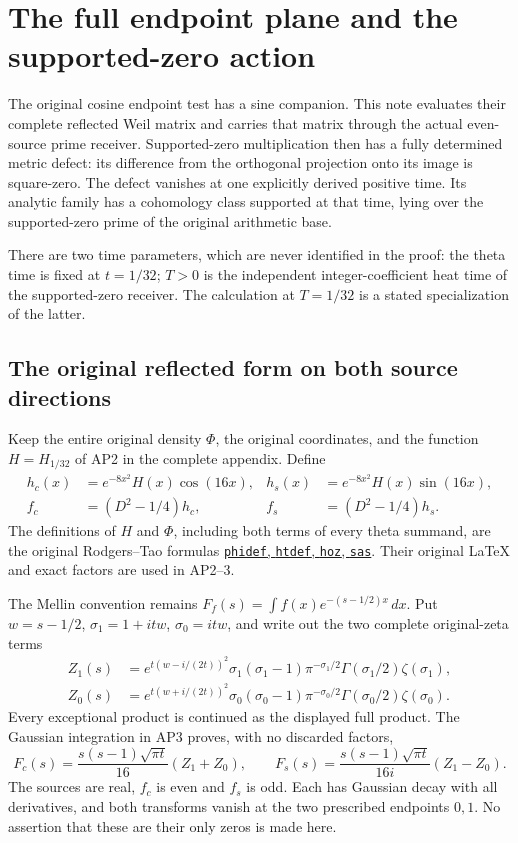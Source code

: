 \section{The full endpoint plane and the supported-zero action}

The original cosine endpoint test has a sine companion. This note
evaluates their complete reflected Weil matrix and carries that matrix
through the actual even-source prime receiver. Supported-zero
multiplication then has a fully determined metric defect: its difference
from the orthogonal projection onto its image is square-zero. The
defect vanishes at one explicitly derived positive time. Its analytic
family has a cohomology class supported at that time, lying over the
supported-zero prime of the original arithmetic base.

There are two time parameters, which are never identified in the proof:
the theta time is fixed at \(t=1/32\); \(T>0\) is the independent
integer-coefficient heat time of the supported-zero receiver. The
calculation at \(T=1/32\) is a stated specialization of the latter.

\subsection{The original reflected form on both source directions}
Keep the entire original density \(\Phi\), the original coordinates,
and the function \(H=H_{1/32}\) of AP2 in the complete appendix.
Define
\[
 \begin{aligned}
 h_c(x)&=e^{-8x^2}H(x)\cos(16x),&
 h_s(x)&=e^{-8x^2}H(x)\sin(16x),\\
 f_c&=(D^2-1/4)h_c,& f_s&=(D^2-1/4)h_s.
 \end{aligned}
 \tag{TS1}
\]
The definitions of \(H\) and \(\Phi\), including both terms of
every theta summand, are the original Rodgers--Tao formulas
\href{https://arxiv.org/abs/1801.05914v5}{\texttt{phidef},
\texttt{htdef}, \texttt{hoz}, \texttt{sas}}. Their original
LaTeX and exact factors are used in AP2--3.

The Mellin convention remains
\(F_f(s)=\int f(x)e^{-(s-1/2)x}\,dx\).
Put \(w=s-1/2\), \(\sigma_1=1+itw\), \(\sigma_0=itw\),
and write out the two complete original-zeta terms
\[
\begin{split}
 Z_1(s)&=e^{t(w-i/(2t))^2}\sigma_1(\sigma_1-1)
       \pi^{-\sigma_1/2}\Gamma(\sigma_1/2)\zeta(\sigma_1),\\
 Z_0(s)&=e^{t(w+i/(2t))^2}\sigma_0(\sigma_0-1)
       \pi^{-\sigma_0/2}\Gamma(\sigma_0/2)\zeta(\sigma_0).
\end{split}\tag{TS2}
\]
Every exceptional product is continued as the displayed full product.
The Gaussian integration in AP3 proves, with no discarded factors,
\[
 F_c(s)=\frac{s(s-1)\sqrt{\pi t}}{16}(Z_1+Z_0),\qquad
 F_s(s)=\frac{s(s-1)\sqrt{\pi t}}{16i}(Z_1-Z_0).
 \tag{TS3}
\]
The sources are real, \(f_c\) is even and \(f_s\) is odd. Each
has Gaussian decay with all derivatives, and both transforms vanish
at the two prescribed endpoints \(0,1\). No assertion that these
are their only zeros is made here.

